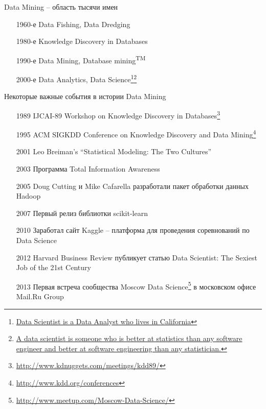 \documentclass[aspectratio=169]{beamer}
\begin{document}
\begin{frame}{Data Mining -- область тысячи имен}

\begin{enumerate}
\item[1960-е] Data Fishing, Data Dredging
\item[1980-е] Knowledge Discovery in Databases
\item[1990-е] Data Mining, Database mining\textsuperscript{TM}
\item[2000-е] Data Analytics, Data Science\footnote{\href{https://twitter.com/nivertech/status/180109930139893761}{Data Scientist is a Data Analyst who lives in California}}\footnote{\href{https://twitter.com/josh_wills/status/198093512149958656}{A data scientist is someone who is better at statistics than any software engineer and better at software engineering than any statistician.}}
\end{enumerate}

\end{frame}

\begin{frame}{Некоторые важные события в истории Data Mining}

\begin{enumerate}
\item[1989] IJCAI-89 Workshop on Knowledge Discovery in Databases\footnote{\url{http://www.kdnuggets.com/meetings/kdd89/}}
\item[1995] ACM SIGKDD Conference on Knowledge Discovery and Data Mining\footnote{\url{http://www.kdd.org/conferences}}
\item[2001] Leo Breiman's ``Statistical Modeling: The Two Cultures''
\item[2003] Программа Total Information Awareness
\item[2005] Doug Cutting и Mike Cafarella разработали пакет обработки данных Hadoop
\item[2007] Первый релиз библиотки scikit-learn
\item[2010] Заработал сайт Kaggle -- платформа для проведения соревнований по Data Science
\item[2012] Harvard Business Review публикует статью Data Scientist: The Sexiest Job of the 21st Century
\item[2013] Первая встреча сообщества Moscow Data Science\footnote{\url{http://www.meetup.com/Moscow-Data-Science/}} в московском офисе Mail.Ru Group
\end{enumerate}

\end{frame}
\end{document}
